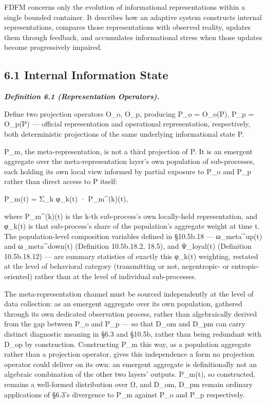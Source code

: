 \documentclass[
]{article}
\begin{document}
FDFM concerns only the evolution of informational representations within
a single bounded container. It describes how an adaptive system
constructs internal representations, compares those representations with
observed reality, updates them through feedback, and accumulates
informational stress when those updates become progressively impaired.

\hypertarget{internal-information-state}{%
\subsection{6.1 Internal Information
State}\label{internal-information-state}}

\emph{\textbf{Definition 6.1 (Representation Operators).}}

Define two projection operators O\_o, O\_p, producing P\_o = O\_o(P),
P\_p = O\_p(P) --- official representation and operational
representation, respectively, both deterministic projections of the same
underlying informational state P.

P\_m, the meta-representation, is not a third projection of P. It is an
emergent aggregate over the meta-representation layer's own population
of sub-processes, each holding its own local view informed by partial
exposure to P\_o and P\_p rather than direct access to P itself:

P\_m(t) = Σ\_k φ\_k(t) · P\_m\^{}(k)(t),

where P\_m\^{}(k)(t) is the k-th sub-process's own locally-held
representation, and φ\_k(t) is that sub-process's share of the
population's aggregate weight at time t. The population-level
composition variables defined in §10.5b.18 --- ω\_meta\^{}up(t) and
ω\_meta\^{}down(t) (Definition 10.5b.18.2, 18.5), and Ψ\_loyal(t)
(Definition 10.5b.18.12) --- are summary statistics of exactly this
φ\_k(t) weighting, restated at the level of behavioral category
(transmitting or not, negentropic- or entropic-oriented) rather than at
the level of individual sub-processes.

The meta-representation channel must be sourced independently at the
level of data collection: as an emergent aggregate over its own
population, gathered through its own dedicated observation process,
rather than algebraically derived from the gap between P\_o and P\_p ---
so that D\_om and D\_pm can carry distinct diagnostic meaning in §6.3
and §10.5b, rather than being redundant with D\_op by construction.
Constructing P\_m this way, as a population aggregate rather than a
projection operator, gives this independence a form no projection
operator could deliver on its own: an emergent aggregate is
definitionally not an algebraic combination of the other two layers'
outputs. P\_m(t), so constructed, remains a well-formed distribution
over Ω, and D\_om, D\_pm remain ordinary applications of §6.3's
divergence to P\_m against P\_o and P\_p respectively.
\end{document}
